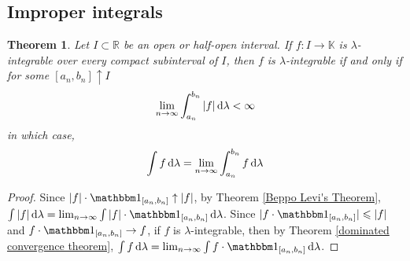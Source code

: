 \documentclass[11pt, a4paper, openany]{book}
\newtheorem{thm}{Theorem}\newtheorem{lem}{Lemma}\newtheorem{crl}{Corollary}
\theoremstyle{definition}
\begin{document}
\subsection{Improper integrals}
    \begin{thm}
        Let $I\subset\mathbb{R}$ be an open or half-open interval. If $f:I\rightarrow \mathbb{K}$ is $\lambda$-integrable over every compact subinterval of $I$, then $f$ is $\lambda$-integrable if and only if for some $[a_n,b_n]\uparrow I$
        \[
            \lim_{n\to\infty}\int_{a_n}^{b_n} |f|\odif\lambda <\infty
        \]
        in which case,
        \[
            \int f\odif\lambda=\lim_{n\to\infty}\int_{a_n}^{b_n} f\odif\lambda
        \]
    \end{thm}
    \begin{proof}
        Since $|f|\cdot \one_{[a_n,b_n]}\uparrow |f|$, by Theorem \ref{Beppo Levi's Theorem}, $\int |f|\odif\lambda=\lim_{n\to\infty}\int |f|\cdot\one_{[a_n,b_n]}\odif\lambda$. Since $|f\cdot \one_{[a_n,b_n]}|\leqslant |f|$ and $f\cdot \one_{[a_n,b_n]}\to f$, if $f$ is $\lambda$-integrable, then by Theorem \ref{dominated convergence theorem}, $\int f\odif\lambda=\lim_{n\to\infty}\int f\cdot \one_{[a_n,b_n]}\odif\lambda$. %
    \end{proof}
\end{document}
